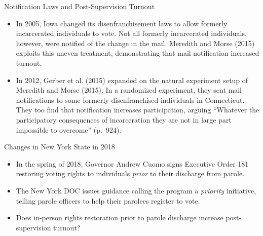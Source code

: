 \documentclass[
  ignorenonframetext,
]{beamer}
\providecommand{\tightlist}{%
  \setlength{\itemsep}{0pt}\setlength{\parskip}{0pt}}
\begin{document}
\begin{frame}{Notification Laws and Post-Supervision Turnout}
\protect\hypertarget{notification-laws-and-post-supervision-turnout}{}
\begin{itemize}[<+->]
\tightlist
\item
  In 2005, Iowa changed its disenfranchisement laws to allow formerly
  incarcerated individuals to vote. Not all formerly incarcerated
  individuals, however, were notified of the change in the mail.
  Meredith and Morse (2015) exploits this uneven treatment,
  demonstrating that mail notification increased turnout.
\end{itemize}

\begin{itemize}[<+->]
\tightlist
\item
  In 2012, Gerber et al. (2015) expanded on the natural experiment setup
  of Meredith and Morse (2015). In a randomized experiment, they sent
  mail notifications to some formerly disenfranchised individuals in
  Connecticut. They too find that notification increases participation,
  arguing ``Whatever the participatory consequences of incarceration
  they are not in large part impossible to overcome'' (p.~924).
\end{itemize}
\end{frame}

\begin{frame}{Changes in New York State in 2018}
\protect\hypertarget{changes-in-new-york-state-in-2018}{}
\begin{itemize}[<+->]
\tightlist
\item
  In the spring of 2018, Governor Andrew Cuomo signs Executive Order 181
  restoring voting rights to individuals \emph{prior} to their discharge
  from parole.
\end{itemize}

\begin{itemize}[<+->]
\tightlist
\item
  The New York DOC issues guidance calling the program a \emph{priority}
  initiative, telling parole officers to help their parolees register to
  vote.
\end{itemize}

\begin{itemize}[<+->]
\tightlist
\item
  Does in-person rights restoration prior to parole discharge increase
  post-supervision turnout?
\end{itemize}
\end{frame}
\end{document}
